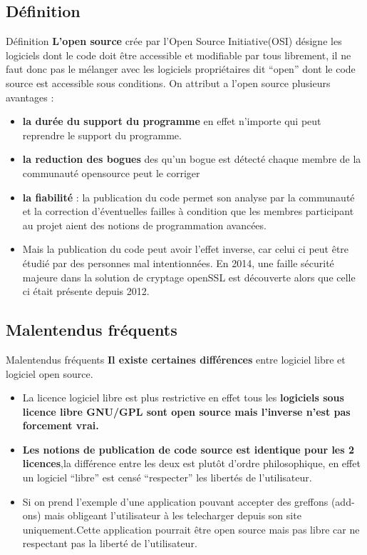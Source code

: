 \subsection{Définition}
\begin{frame}[t,fragile]{Définition}
    \fontsize{8}{10.5}\selectfont
    \textbf{L’open source} crée par l’Open Source Initiative(OSI) désigne les logiciels dont le code doit être accessible et modifiable par tous librement, il ne faut donc pas le mélanger avec les logiciels propriétaires dit “open” dont le code source est accessible sous conditions.
On attribut a l’open source plusieurs avantages : \pause
    \begin{itemize}
        \item \textbf{la durée du support du programme} en effet n’importe qui peut reprendre le support du programme. \pause
        \item \textbf{la reduction des bogues} des qu’un bogue est détecté chaque membre de la communauté opensource peut le corriger \pause
        \item \textbf{la fiabilité} : la publication du code permet son analyse par la communauté et la correction d'éventuelles failles à condition que les membres participant au projet aient des notions de programmation avancées.\pause
        \item Mais la publication du code peut avoir l’effet inverse, car celui ci peut être étudié par des personnes mal intentionnées. En 2014, une faille sécurité majeure dans la solution de cryptage openSSL est découverte alors que celle ci était présente depuis 2012.
    \end{itemize}
\end{frame}

\subsection{Malentendus fréquents}
\begin{frame}[t,fragile]{Malentendus fréquents}
    \fontsize{10}{12}\selectfont
    \textbf{Il existe certaines différences} entre logiciel libre et logiciel open source.\pause
        \begin{itemize}
            \item La licence logiciel libre est plus restrictive en effet tous les \textbf{logiciels sous licence libre GNU/GPL sont open source mais l’inverse n’est pas forcement vrai.} \pause
            \item \textbf{Les notions de publication de code source est identique pour les 2 licences},\linebreak la différence entre les deux est plutôt d’ordre philosophique, en effet un logiciel “libre” est censé “respecter” les libertés de  l’utilisateur. \pause
            \item Si on prend l'exemple d'une application pouvant accepter des greffons (add-ons) mais obligeant l’utilisateur à les telecharger depuis son site uniquement.\linebreak \pause Cette application pourrait être open source mais pas libre car ne respectant pas la liberté de l’utilisateur.
        \end{itemize}
\end{frame}


